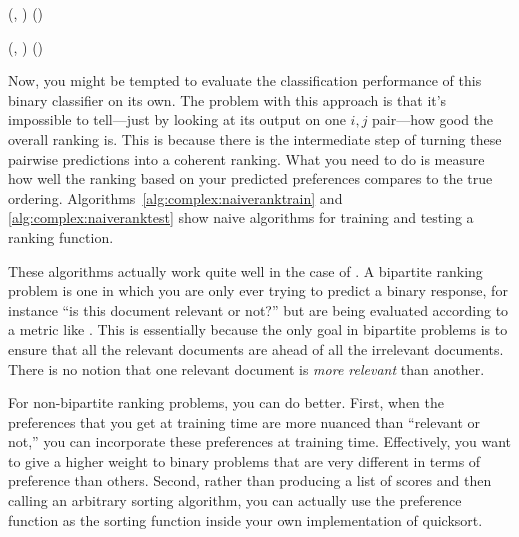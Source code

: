   {(, )}
  {
\ENDIF
\ENDFOR
\ENDFOR
\RETURN {}()
}

  {(, \VAR{$\hat\vx$})}
  {
\ENDFOR
\RETURN {}()
}

Now, you might be tempted to evaluate the classification performance
of this binary classifier on its own.  The problem with this approach
is that it's impossible to tell---just by looking at its output on one
$i,j$ pair---how good the overall ranking is.  This is because there
is the intermediate step of turning these pairwise predictions into a
coherent ranking.  What you need to do is measure how well the ranking
based on your predicted preferences compares to the true ordering.
Algorithms~\ref{alg:complex:naiveranktrain} and
\ref{alg:complex:naiveranktest} show naive algorithms for training and
testing a ranking function.

These algorithms actually work quite well in the case of
.  A bipartite ranking problem is
one in which you are only ever trying to predict a binary response,
for instance ``is this document relevant or not?'' but are being
evaluated according to a metric like .  This is
essentially because the only goal in bipartite problems is to ensure
that all the relevant documents are ahead of all the irrelevant
documents.  There is no notion that one relevant document is
\emph{more relevant} than another.

For non-bipartite ranking problems, you can do better.  First, when
the preferences that you get at training time are more nuanced than
``relevant or not,'' you can incorporate these preferences at training
time.  Effectively, you want to give a higher weight to binary
problems that are very different in terms of preference than others.
Second, rather than producing a list of scores and then calling an
arbitrary sorting algorithm, you can actually use the preference
function as the sorting function inside your own implementation of
quicksort.  

